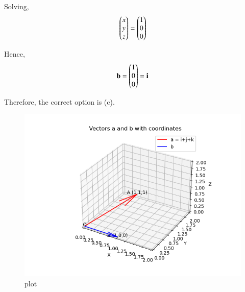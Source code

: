 \documentclass[journal]{IEEEtran}
\begin{document}
Solving,
\begin{align}
\begin{pmatrix}x\\y\\z\end{pmatrix}=\begin{pmatrix}1\\0\\0\end{pmatrix}
\end{align}

Hence,
\begin{align}
\mathbf{b}=\begin{pmatrix}1\\0\\0\end{pmatrix}=\mathbf{i}
\end{align}

Therefore, the correct option is (c).

\begin{figure}[H]
\centering
\includegraphics[width=0.75\columnwidth]{figs/5.png}
\caption{\centering plot}
\label{fig:placeholder_125}
\end{figure}
\end{document}
